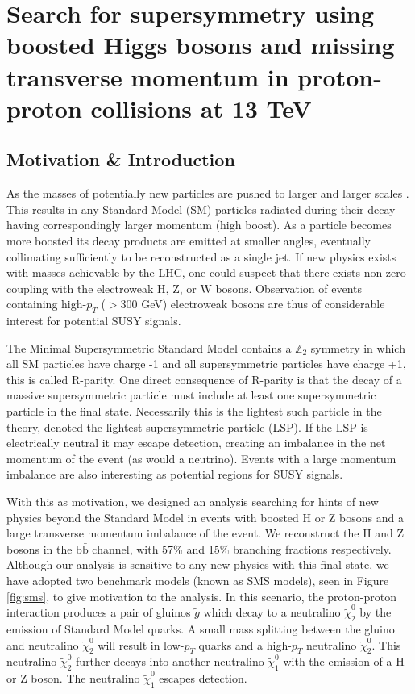 \chapter{Search for supersymmetry using boosted Higgs bosons and missing transverse momentum in proton-proton collisions at 13 TeV}
\label{chap:analysis}

\section{Motivation \& Introduction}

As the masses of potentially new particles are pushed to larger and larger scales \cite{CMS-SUS-16-033} \cite{CMS-SUS-15-002}. This results in any Standard Model (SM) particles radiated during their decay having correspondingly larger momentum (high boost). As a particle becomes more boosted its decay products are emitted at smaller angles, eventually collimating sufficiently to be reconstructed as a single jet. If new physics exists with masses achievable by the LHC, one could suspect that there exists non-zero coupling with the electroweak H, Z, or W bosons. Observation of events containing high-$p_{T}$ ($>$300 GeV) electroweak bosons are thus of considerable interest for potential SUSY signals. 

The Minimal Supersymmetric Standard Model contains a $\mathbb{Z}_{2}$ symmetry in which all SM particles have charge -1 and all supersymmetric particles have charge +1, this is called R-parity\cite{susyprimer}. One direct consequence of R-parity is that the decay of a massive supersymmetric particle must include at least one supersymmetric particle in the final state. Necessarily this is the lightest such particle in the theory, denoted the lightest supersymmetric particle (LSP). If the LSP is electrically neutral it may escape detection, creating an imbalance in the net momentum of the event (as would a neutrino). Events with a large momentum imbalance are also interesting as potential regions for SUSY signals.

With this as motivation, we designed an analysis searching for hints of new physics beyond the Standard Model in events with boosted H or Z bosons and a large transverse momentum imbalance of the event. We reconstruct the H and Z bosons in the $\mathrm{b}\bar{\mathrm{b}}$ channel, with 57\% and 15\% branching fractions respectively. Although our analysis is sensitive to any new physics with this final state, we have adopted two benchmark models (known as SMS models\cite{CMS-SUS-11-016}), seen in Figure \ref{fig:sms}, to give motivation to the analysis. In this scenario, the proton-proton interaction produces a pair of gluinos $\tilde{g}$ which decay to a neutralino $\tilde{\chi}_{2}^{0}$ by the emission of Standard Model quarks. A small mass splitting between the gluino and neutralino $\tilde{\chi}_{2}^{0}$ will result in low-$p_{T}$ quarks and a high-$p_{T}$ neutralino $\tilde{\chi}_{2}^{0}$. This neutralino $\tilde{\chi}_{2}^{0}$ further decays into another neutralino $\tilde{\chi}_{1}^{0}$ with the emission of a H or Z boson. The neutralino $\tilde{\chi}_{1}^{0}$ escapes detection.

